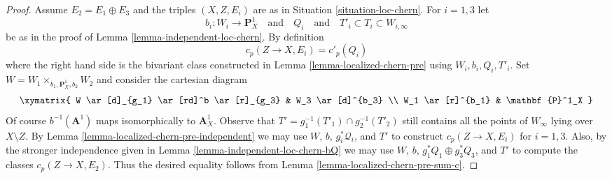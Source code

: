 \begin{proof}
\medskip\noindent
Assume $E_2 = E_1 \oplus E_3$ and the triples $(X, Z, E_i)$
are as in Situation \ref{situation-loc-chern}.
For $i = 1, 3$ let
$$
b_i : W_i \to \mathbf{P}^1_X
\quad\text{and}\quad
Q_i
\quad\text{and}\quad
T'_i \subset T_i \subset W_{i, \infty}
$$
be as in the proof of Lemma \ref{lemma-independent-loc-chern}.
By definition
$$
c_p(Z \to X, E_i) = c'_p(Q_i)
$$
where the right hand side is the bivariant class constructed in
Lemma \ref{lemma-localized-chern-pre} using $W_i, b_i, Q_i, T'_i$.
Set $W = W_1 \times_{b_1, \mathbf{P}^1_X, b_2} W_2$ and consider
the cartesian diagram
$$
\xymatrix{
W \ar[d]_{g_1} \ar[rd]^b \ar[r]_{g_3} & W_3 \ar[d]^{b_3} \\
W_1 \ar[r]^{b_1} & \mathbf{P}^1_X
}
$$
Of course $b^{-1}(\mathbf{A}^1)$ maps isomorphically to $\mathbf{A}^1_X$.
Observe that $T' = g_1^{-1}(T'_1) \cap g_2^{-1}(T'_2)$ still contains
all the points of $W_\infty$ lying over $X \setminus Z$.
By Lemma \ref{lemma-localized-chern-pre-independent} we may use
$W$, $b$, $g_i^*\mathcal{Q}_i$, and
$T'$ to construct $c_p(Z \to X, E_i)$ for $i = 1, 3$.
Also, by the stronger independence given in
Lemma \ref{lemma-independent-loc-chern-bQ} we may use
$W$, $b$, $g_1^*Q_1 \oplus g_3^*Q_3$, and $T'$
to compute the classes $c_p(Z \to X, E_2)$.
Thus the desired equality follows from
Lemma \ref{lemma-localized-chern-pre-sum-c}.
\end{proof}